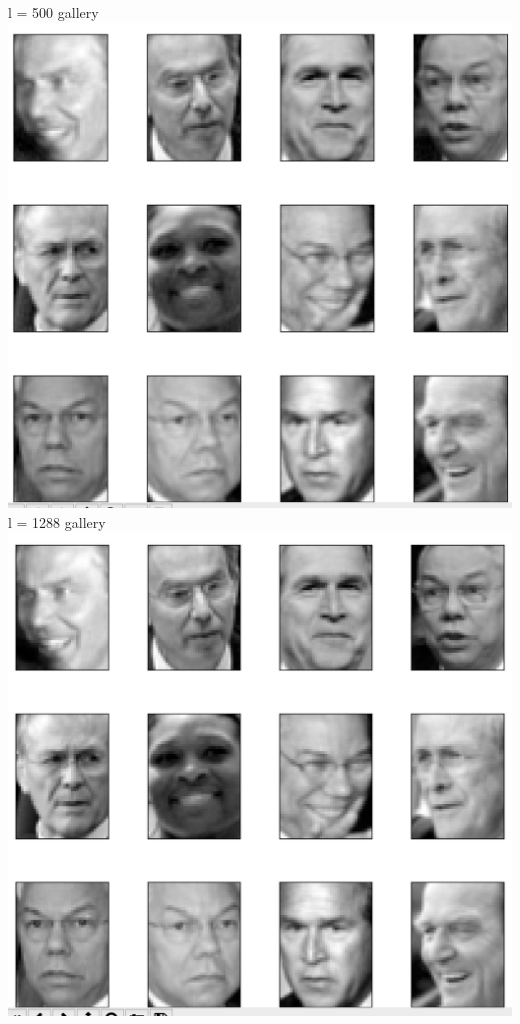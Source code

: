 \documentclass[11pt]{article}
\begin{document}
\begin{enumerate}
{l = 500 gallery \newline{}
\includegraphics[scale = 0.6]{pca_l=500.png} \newline{} \newpage
l = 1288 gallery \newline{}
\includegraphics[scale = 0.6]{pca_l=1288.png} \newline{} \newline{}
}
\end{enumerate}
\end{document}
